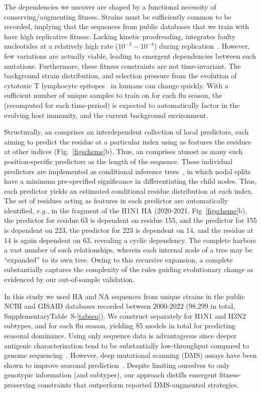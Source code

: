 \documentclass[onecolumn, compsoc,10pt]{IEEEtran}
\def\SUPPLEMENTARY{Supplementary}
\begin{document}
The dependencies we uncover are shaped by  a  functional necessity of conserving/augmenting  fitness. Strains must be sufficiently common  to be recorded, implying that the sequences from public databases that we train  with have  high replicative fitness. Lacking kinetic proofreading, \infl integrates  faulty nucleotides   at a relatively high rate ($10^{-3}-10^{-4}$) during  replication~\cite{ahlquist2002rna,chen2006avian}. However, few variations are actually viable, leading to emergent dependencies between such mutations. Furthermore, these fitness constraints are not time-invariant. The background strain distribution, and selection pressure from the evolution of cytotoxic T lymphocyte  epitopes~\cite{woolthuis2016long,fan2012role,van2016differential,berkhoff2007assessment,van2012evasion} in humans can change quickly. With a sufficient number of unique samples to train on for each flu season, the \enet (recomputed for each time-period) is expected to automatically factor in the evolving host immunity, and the current background environment.  

Structurally, an \enet comprises an interdependent collection of  local predictors, each aiming to predict the  residue at a particular index  using as features  the residues   at other  indices  (Fig.~\ref{figscheme}b). Thus,  an \enet comprises atmost as many such  position-specific predictors as the length of the sequence. These individual predictors are implemented as conditional inference trees~\cite{Hothorn06unbiasedrecursive}, in which  nodal splits  have  a minimum pre-specified significance in differentiating the  child nodes. Thus, each predictor yields an estimated conditional residue distribution  at each index. The set of residues acting as features in each predictor are automatically identified, $e.g.$, in the fragment of the  H1N1 HA \enet (2020-2021, Fig~\ref{figscheme}b), the predictor for residue 63 is dependent on   residue  155, and the predictor for  155 is dependent on  223, the predictor for  223 is dependent on  14, and the residue at  14 is again dependent on  63, revealing a cyclic dependency. The complete \enet harbors a vast number of such  relationships, wherein each internal node of a tree may be  ``expanded'' to its own tree. Owing to this recursive expansion,  a complete \enet substantially captures the complexity of the rules guiding evolutionary change as evidenced by our out-of-sample validation.

In this study we used  HA and NA  sequences from   unique \infl strains in the public NCBI and GISAID databases recorded between 2000-2022 (98,299 in total, \SUPPLEMENTARY Table~S-\ref{tabseq}). We  construct  separately for H1N1 and H3N2 subtypes, and for each flu season, yielding $85$ models in total for predicting seasonal dominance. Using only sequence data is advantageous since deeper antigenic characterization  tend to be substantially  low-throughput compared to genome sequencing~\cite{wood2012reproducibility}. However,   deep mutational scanning (DMS) assays  have been shown to improve seasonal prediction~\cite{huddleston2020integrating}. Despite limiting ourselves to only genotypic  information (and subtypes), our approach  distills  emergent  fitness-preserving constraints   that outperform reported DMS-augmented strategies.
\end{document}
